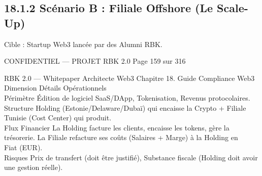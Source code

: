 \documentclass[12pt,landscape,a4paper]{article}
\newenvironment{confidential}
{\begin{tcolorbox}[
    colback=rbkred!5!white,
    colframe=rbkred!75!black,
    title=CONFIDENTIEL,
    fonttitle=\bfseries\color{white},
    coltitle=rbkred!75!black,
    breakable,
    enhanced,
    frame hidden,
    borderline west={2pt}{0pt}{rbkred!75!black}
]}
{\end{tcolorbox}}
\begin{document}
\subsection{18.1.2 Scénario B : Filiale Offshore (Le Scale-Up)}
Cible : Startup Web3 lancée par des Alumni RBK.\\
\vspace{0.5em}
\vspace{0.5em}
\vspace{0.5em}
\vspace{0.5em}
\begin{confidential}CONFIDENTIEL — PROJET RBK 2.0                                  Page 159 sur 316\end{confidential}
RBK 2.0 — Whitepaper Architecte Web3                                                                             Chapitre 18. Guide Compliance Web3\\
\vspace{0.5em}
\vspace{0.5em}
\vspace{0.5em}
Dimension      Détails Opérationnels\\
Périmètre      Édition de logiciel SaaS/DApp, Tokenisation, Revenus protocolaires.\\
Structure      Holding (Estonie/Delaware/Dubaï) qui encaisse la Crypto + Filiale Tunisie (Cost Center) qui produit.\\
Flux Financier La Holding facture les clients, encaisse les tokens, gère la trésorerie. La Filiale refacture ses coûts (Salaires + Marge) à la Holding en\\
Fiat (EUR).\\
Risques        Prix de transfert (doit être justifié), Substance fiscale (Holding doit avoir une gestion réelle).\\
\vspace{0.5em}
\vspace{0.5em}
\vspace{0.5em}
\end{document}
